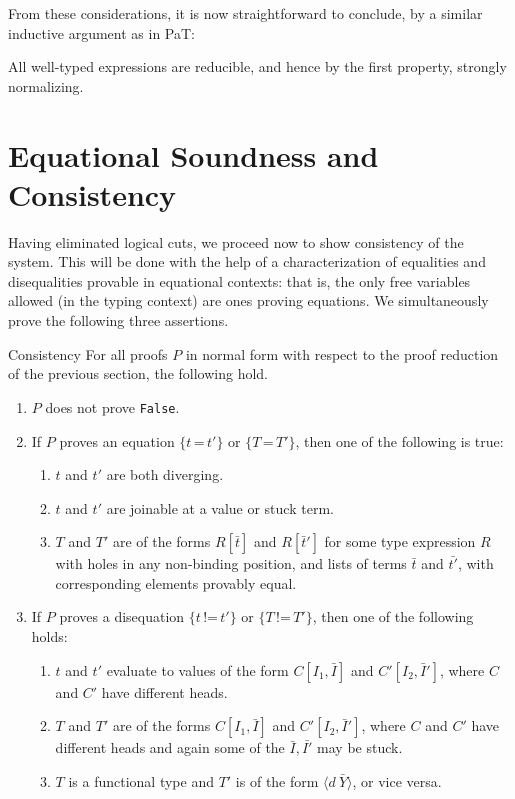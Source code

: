 \documentclass{fundam}
\newcommand{\Eq}[0]{\texttt{=}}
\newcommand{\Neq}[0]{\texttt{!=}}
\begin{document}
From these considerations, it is now straightforward to conclude,
by a similar inductive argument as in PaT:

\begin{theorem}
All well-typed expressions are reducible, and hence by the first
property, strongly normalizing.
\end{theorem}

\section{Equational Soundness and Consistency}

Having eliminated logical cuts, we proceed now to show consistency of
the system.  This will be done with the help of a characterization of
equalities and disequalities provable in equational contexts: that is,
the only free variables allowed (in the typing context) are ones
proving equations.  We simultaneously prove the following three
assertions.

\begin{theorem}{Consistency}
\label{thm:consistency}
For all proofs $P$ in normal form with respect to the
proof reduction of the previous section, the following hold. 

\begin{enumerate}
\item $P$ does not
prove \texttt{False}.  
\item If $P$ proves an equation $\{t\, \Eq\,
t'\}$ or $\{T\,\Eq\, T'\}$, then one of the following is true:

\begin{enumerate}
\item $t$ and $t'$ are both diverging.

\item $t$ and $t'$ are joinable at a value or stuck term.

\item $T$ and $T'$ are of the forms $R[\bar{t}]$ and $R[\bar{t}']$ for
some type expression $R$ with holes in any non-binding position, and
lists of terms $\bar{t}$ and $\bar{t'}$, with corresponding elements
provably equal.
\end{enumerate}

\item If $P$ proves a disequation $\{t\, \Neq\, t'\}$ or $\{T\,\Neq\,
T'\}$, then one of the following holds:

\begin{enumerate}
\item $t$ and $t'$ evaluate to values of the form
$C[I_1,\bar{I}]$ and $C'[I_2,\bar{I}']$, where $C$ and $C'$ have
different heads.

\item $T$ and $T'$ are of the forms $C[I_1,\bar{I}]$ and
$C'[I_2,\bar{I}']$, where $C$ and $C'$ have different heads and
again some of the $\bar{I},\bar{I'}$ may be stuck.

\item $T$ is a functional type and $T'$ is of the form $\langle d\
\bar{Y}\rangle$, or vice versa.
\end{enumerate}
\end{enumerate}
\end{theorem}
\end{document}
